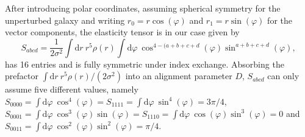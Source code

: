 \documentclass[a4paper,fleqn,usenatbib]{mnras}
\newcommand{\dd}{\mathrm{d}}
\begin{document}
After introducing polar coordinates, assuming spherical symmetry for the unperturbed galaxy and writing $r_0=r\cos(\varphi)$ and $r_1=r\sin(\varphi)$ for the vector components, the elasticity tensor is in our case given by
\begin{equation}
S_{abcd} = 
\frac{1}{2\sigma^2}\int\dd r\:r^5\rho(r)\int\dd\varphi\:\cos^{4-(a+b+c+d}(\varphi)\sin^{a+b+c+d}(\varphi),
\end{equation}
has 16 entries and is fully symmetric under index exchange. Absorbing the prefactor $\int\dd r\:r^5\rho(r)/(2\sigma^2)$ into an alignment parameter $D$, $S_{abcd}$ can only assume five different values, namely $S_{0000} = \int\dd\varphi\:\cos^4(\varphi) = S_{1111} = \int\dd\varphi\:\sin^4(\varphi) = 3\pi/4$, $S_{0001} = \int\dd\varphi\:\cos^3(\varphi)\sin(\varphi) = S_{1110} = \int\dd\varphi\:\cos(\varphi)\sin^3(\varphi) = 0$ and $S_{0011} = \int\dd\varphi\:\cos^2(\varphi)\sin^2(\varphi) = \pi/4$. 
\end{document}
